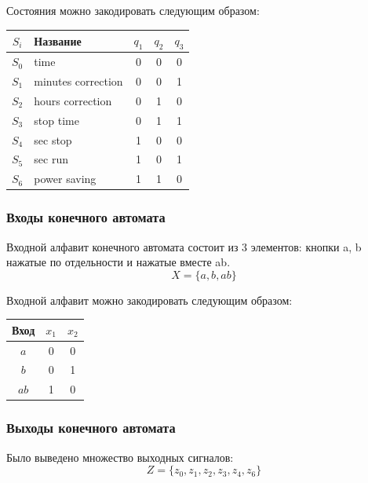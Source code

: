 \documentclass[10pt,a4paper,final]{article} %
\begin{document}
\noindent   Состояния можно закодировать следующим образом: 

\begin{table}[htbp]
	\centering
	\begin{tabular}{|c|l|c|c|c|}
		\hline
		$S_i$ & Название & $q_1$ & $q_2$ & $q_3$ \\ 
		\hline
		$S_0$ & time 				& 0 & 0 & 0  \\ 
		$S_1$ & minutes correction 	& 0 & 0 & 1 \\ 
		$S_2$ & hours correction 	& 0 & 1 & 0 \\ 
		$S_3$ & stop time 			& 0 & 1 & 1 \\ 
		$S_4$ & sec stop 			& 1 & 0 & 0 \\ 
		$S_5$ & sec run 			& 1 & 0 & 1 \\ 
		$S_6$ & power saving 		& 1 & 1 & 0 \\ 
		
		\hline
	\end{tabular}
\end{table}


\subsubsection{Входы конечного автомата}

Входной алфавит конечного автомата состоит из 3 элементов: кнопки a, b нажатые по отдельности и нажатые вместе ab.
$$X = \{a, b, ab\}$$

Входной алфавит можно закодировать следующим образом:
\begin{table}[htbp]
	\centering
	\begin{tabular}{|c|c|c|}
		\hline
		Вход & $x_1$ & $x_2$ \\
		\hline
		$a$ & 0 & 0 \\
		$b$ & 0 & 1 \\
		$ab$ & 1 & 0 \\
		\hline
	\end{tabular}
\end{table}

\subsubsection{Выходы конечного автомата}

Было выведено множество выходных сигналов:
$$Z = \{z_0, z_1, z_2, z_3, z_4, z_6\}$$
\end{document}
